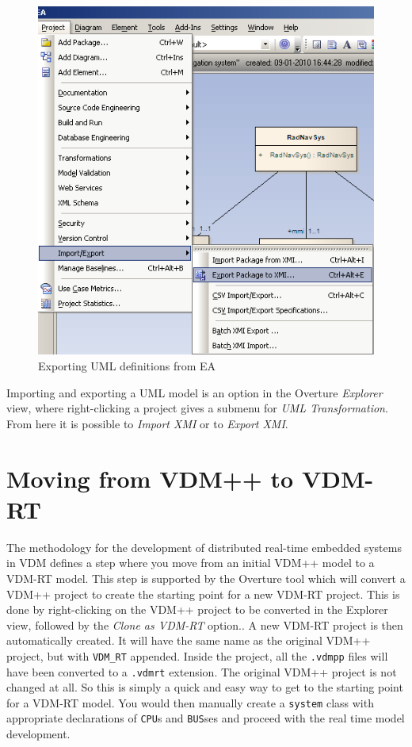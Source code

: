 \documentclass{overturerepchap}
\begin{document}
\begin{figure}[htbp]
\begin{center}
\includegraphics[width=4.5in]{screenDumps/exportfromUML}
\caption{Exporting UML definitions from EA\label{fig:exportfromUML}}
\end{center}
\end{figure}

Importing and exporting a UML model is
an option in the Overture \emph{Explorer} view, where right-clicking
a project gives a submenu for
\emph{UML Transformation}. From here
it is possible to \emph{Import XMI} or to
\emph{Export XMI}.

\chapter{Moving from VDM++ to VDM-RT}\label{sec:ToVDMRT}

The methodology for the development of distributed real-time
embedded systems in VDM defines a step where you
move from an initial VDM++ model to a VDM-RT model\cite{Larsen&09b}. This
step is supported by the Overture tool which will convert
a VDM++ project to create the starting point for a new VDM-RT
project. This is done by right-clicking on the VDM++ project to be
converted in the Explorer view, followed by 
the \emph{Clone as VDM-RT} option.. A new VDM-RT project is then automatically
created. It will have the
same name as the original VDM++ project, but with \texttt{VDM\_RT} appended.
Inside the project, all the \texttt{.vdmpp} files will have been converted
to a \texttt{.vdmrt} extension. The original VDM++ project is not
changed at all. So this is simply a quick and easy way to get to the
starting point for a VDM-RT model. You would then manually create
a \texttt{system} class with appropriate declarations of
\texttt{CPU}s and \texttt{BUS}ses and proceed with the real time
model development.
 
\end{document}
